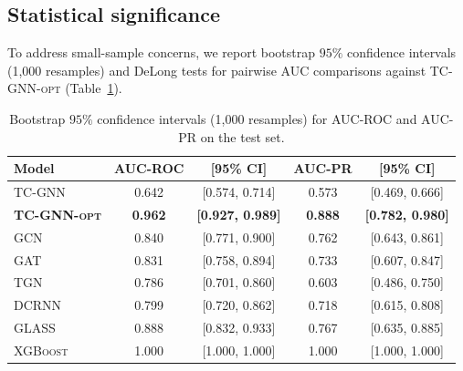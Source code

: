 \documentclass[journal,onecolumn]{IEEEtran}
\begin{document}
\subsection{Statistical significance}
\label{sec:exp-stats}

To address small-sample concerns, we report bootstrap $95\%$ confidence
intervals (1{,}000 resamples) and DeLong tests for pairwise AUC
comparisons against \textsc{TC-GNN-opt} (Table~\ref{tab:ci}).

\begin{table}[t]
\centering
\caption{Bootstrap $95\%$ confidence intervals (1{,}000 resamples)
for AUC-ROC and AUC-PR on the test set.}
\label{tab:ci}
\small
\begin{tabular}{lcccc}
\toprule
\textbf{Model} & \textbf{AUC-ROC} & \textbf{[95\% CI]} & \textbf{AUC-PR} & \textbf{[95\% CI]} \\
\midrule
\textsc{TC-GNN}      & 0.642 & [0.574, 0.714] & 0.573 & [0.469, 0.666] \\
\textbf{\textsc{TC-GNN-opt}} & \textbf{0.962} & \textbf{[0.927, 0.989]} & \textbf{0.888} & \textbf{[0.782, 0.980]} \\
\textsc{GCN}         & 0.840 & [0.771, 0.900] & 0.762 & [0.643, 0.861] \\
\textsc{GAT}         & 0.831 & [0.758, 0.894] & 0.733 & [0.607, 0.847] \\
\textsc{TGN}         & 0.786 & [0.701, 0.860] & 0.603 & [0.486, 0.750] \\
\textsc{DCRNN}       & 0.799 & [0.720, 0.862] & 0.718 & [0.615, 0.808] \\
\textsc{GLASS}       & 0.888 & [0.832, 0.933] & 0.767 & [0.635, 0.885] \\
\textsc{XGBoost}     & 1.000 & [1.000, 1.000] & 1.000 & [1.000, 1.000] \\
\bottomrule
\end{tabular}
\end{table}
\end{document}
